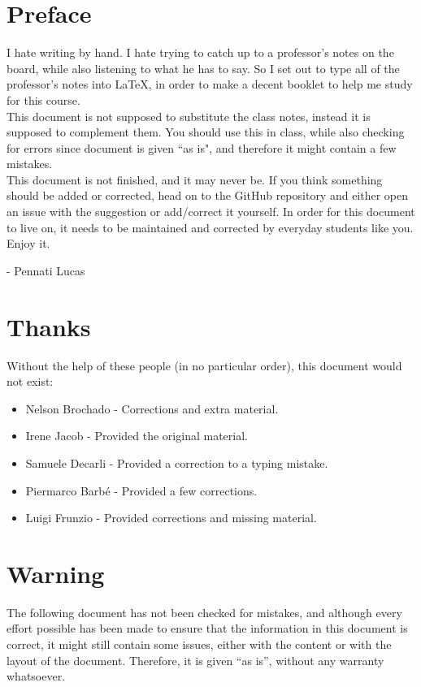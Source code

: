 \section*{Preface}
I hate writing by hand. I hate trying to catch up to a professor's notes on the board, while also listening to what he has to say. So I set out to type all of the professor's notes into \LaTeX, in order to make a decent booklet to help me study for this course.\\

This document is not supposed to substitute the class notes, instead it is supposed to complement them. You should use this in class, while also checking for errors since document is given ``as is", and therefore it might contain a few mistakes.\\

This document is not finished, and it may never be. If you think something should be added or corrected, head on to the GitHub repository and either open an issue with the suggestion or add/correct it yourself. In order for this document to live on, it needs to be maintained and corrected by everyday students like you.\\

\noindent Enjoy it.
\begin{flushright}
- Pennati Lucas
\end{flushright}
\section*{Thanks}
Without the help of these people (in no particular order), this document would not exist:
\begin{itemize}
\item Nelson Brochado - Corrections and extra material.
\item Irene Jacob - Provided the original material.
\item Samuele Decarli - Provided a correction to a typing mistake.
\item Piermarco Barb\'{e} - Provided a few corrections.
\item Luigi Frunzio - Provided corrections and missing material.
\end{itemize}
\section*{Warning}
The following document has not been checked for mistakes, and although every effort possible has been made to ensure that the information in this document is correct, it might still contain some issues, either with the content or with the layout of the document. Therefore, it is given ``as is'', without any warranty whatsoever. \\

